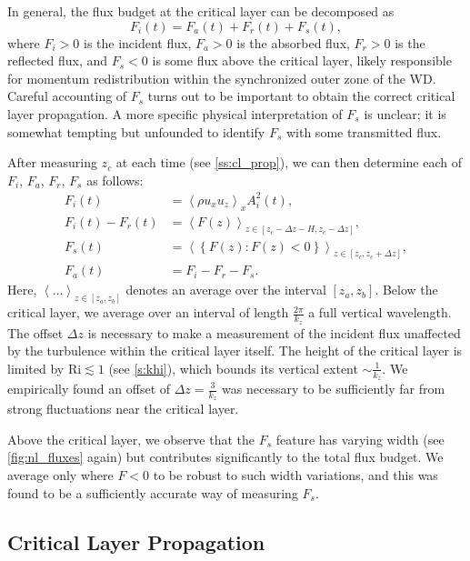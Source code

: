 \documentclass[
        fleqn,
        usenatbib,
        referee,
    ]{mnras}
\newcommand*{\ev}[1]{\left\langle#1\right\rangle}
\newcommand*{\z}[1]{\left\{#1\right\}}
\begin{document}
In general, the flux budget at the critical layer can be decomposed as
\begin{equation}
    F_i(t) = F_a(t) + F_r(t) + F_s(t),
\end{equation}
where $F_i > 0$ is the incident flux, $F_a > 0$ is the absorbed flux, $F_r > 0$
is the reflected flux, and $F_s < 0$ is some flux above the critical layer,
likely responsible for momentum redistribution within the synchronized outer
zone of the WD\@. Careful accounting of $F_s$ turns out to be important to
obtain the correct critical layer propagation. A more specific physical
interpretation of $F_s$ is unclear; it is somewhat tempting but unfounded to
identify $F_s$ with some transmitted flux.

After measuring $z_c$ at each time (see \autoref{ss:cl_prop}), we can then
determine each of $F_i$, $F_a$, $F_r$, $F_s$ as follows:
\begin{align}
    F_i(t) &= \ev{\rho u_{x} u_{z}}_xA_i^2(t),\\
    F_i(t) - F_r(t) &= \ev{F(z)}_{z \in [z_c - \Delta z - H, z_c - \Delta z]}
        ,\label{eq:fr_def}\\
    F_s(t) &= \ev{\z{F(z): F(z) < 0}}_{z \in [z_c, z_c + \Delta z]},
        \label{eq:fs_def}\\
    F_a(t) &= F_i - F_r - F_s.\label{eq:fa_def}
\end{align}
Here, $\ev{\dots}_{z \in [z_a, z_b]}$ denotes an average over the interval
$[z_a, z_b]$. Below the critical layer, we average over an interval of length
$\frac{2\pi}{k_{z}}$ a full vertical wavelength. The offset $\Delta z$ is
necessary to make a measurement of the incident flux unaffected by the
turbulence within the critical layer itself. The height of the critical layer is
limited by $\mathrm{Ri} \lesssim 1$ (see \autoref{s:khi}), which bounds its
vertical extent $\sim \frac{1}{k_{z}}$. We empirically found an offset of
$\Delta z = \frac{3}{k_z}$ was necessary to be sufficiently far from strong
fluctuations near the critical layer.

Above the critical layer, we observe that the $F_s$ feature has varying width
(see \autoref{fig:nl_fluxes} again) but contributes significantly to the total
flux budget. We average only where $F < 0$ to be robust to such width
variations, and this was found to be a sufficiently accurate way of measuring
$F_s$.

\subsection{Critical Layer Propagation}\label{ss:cl_prop}
\end{document}
